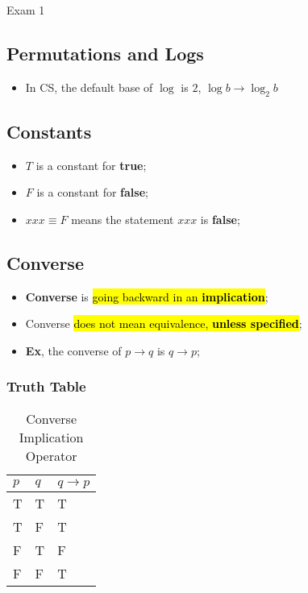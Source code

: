 \documentclass{note}
\begin{document}
\begin{note}{Exam 1}
        \subsection{Permutations and Logs}

        \begin{itemize}
            \item In CS, the default base of $ \log $ is $ 2 $, $ \log b \to \log_{2} b $ 
        \end{itemize}

        \subsection{Constants}
        \begin{itemize}
            \item $ T $ is a constant for \textbf{true};
            \item $ F $ is a constant for \textbf{false};
            \item $ xxx \equiv F $ means the statement $ xxx $ is \textbf{false};
        \end{itemize}

        \subsection{Converse}
        \begin{itemize}
            \item \textbf{Converse} is \hl{going backward in an \textbf{implication}};
            \item Converse \hl{does not mean equivalence, \textbf{unless specified}};
            \item \textbf{Ex}, the converse of $ p \to q $ is $ q \to p $;
        \end{itemize}

        \subsubsection{Truth Table}
        \begin{longtabu} to \textwidth{ | X[l, 1] | X[l, 1] | X[l, 2] | }
            \caption{Converse Implication Operator}\\
            \hline
            $ p $ & $ q $ & $ q \to p $ \\ \hline \hline
            T & T & T \\ \hline
            T & F & T \\ \hline
            F & T & F \\ \hline
            F & F & T \\ \hline
        \end{longtabu}


\end{note}
\end{document}
